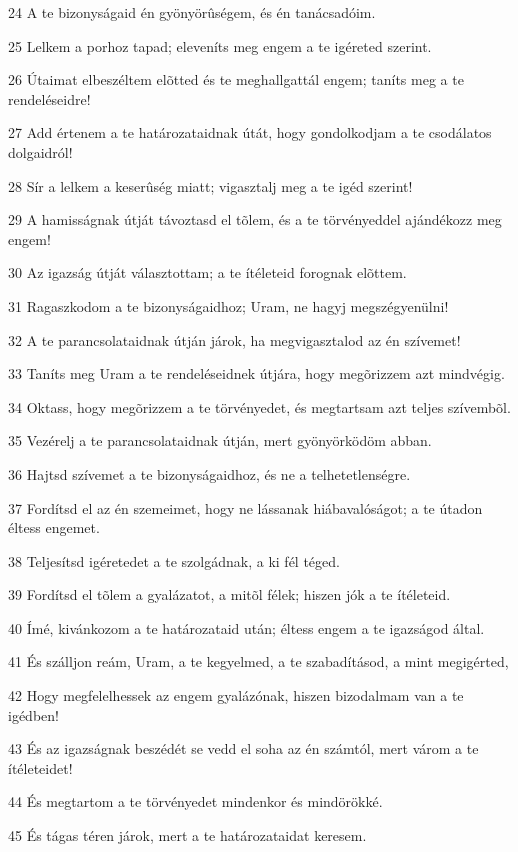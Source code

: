 \par 24 A te bizonyságaid én gyönyörûségem, és én tanácsadóim.
\par 25 Lelkem a porhoz tapad; eleveníts meg engem a te igéreted szerint.
\par 26 Útaimat elbeszéltem elõtted és te meghallgattál engem; taníts meg a te rendeléseidre!
\par 27 Add értenem a te határozataidnak útát, hogy gondolkodjam a te csodálatos dolgaidról!
\par 28 Sír a lelkem a keserûség miatt; vigasztalj meg a te igéd szerint!
\par 29 A hamisságnak útját távoztasd el tõlem, és a te törvényeddel ajándékozz meg engem!
\par 30 Az igazság útját választottam; a te ítéleteid forognak elõttem.
\par 31 Ragaszkodom a te bizonyságaidhoz; Uram, ne hagyj megszégyenülni!
\par 32 A te parancsolataidnak útján járok, ha megvigasztalod az én szívemet!
\par 33 Taníts meg Uram a te rendeléseidnek útjára, hogy megõrizzem azt mindvégig.
\par 34 Oktass, hogy megõrizzem a te törvényedet, és megtartsam azt teljes szívembõl.
\par 35 Vezérelj a te parancsolataidnak útján, mert gyönyörködöm abban.
\par 36 Hajtsd szívemet a te bizonyságaidhoz, és ne a telhetetlenségre.
\par 37 Fordítsd el az én szemeimet, hogy ne lássanak hiábavalóságot; a te útadon éltess engemet.
\par 38 Teljesítsd igéretedet a te szolgádnak, a ki fél téged.
\par 39 Fordítsd el tõlem a gyalázatot, a mitõl félek; hiszen jók a te ítéleteid.
\par 40 Ímé, kivánkozom a te határozataid után; éltess engem a te igazságod által.
\par 41 És szálljon reám, Uram, a te kegyelmed, a te szabadításod, a mint megigérted,
\par 42 Hogy megfelelhessek az engem gyalázónak, hiszen bizodalmam van a te igédben!
\par 43 És az igazságnak beszédét se vedd el soha az én számtól, mert várom a te ítéleteidet!
\par 44 És megtartom a te törvényedet mindenkor és mindörökké.
\par 45 És tágas téren járok, mert a te határozataidat keresem.
